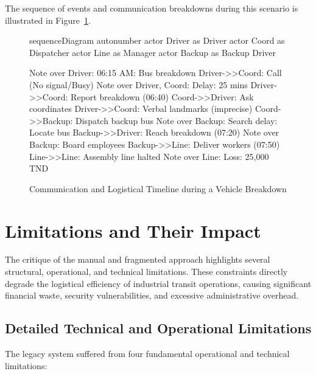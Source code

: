 The sequence of events and communication breakdowns during this scenario is illustrated in Figure~\ref{fig:breakdown_scenario_timeline}.

\begin{figure}[H]
  \centering
  \begin{mermaid}[width=1.0\textwidth]
sequenceDiagram
    autonumber
    actor Driver as Driver
    actor Coord as Dispatcher
    actor Line as Manager
    actor Backup as Backup Driver

    Note over Driver: 06:15 AM: Bus breakdown
    Driver->>Coord: Call (No signal/Busy)
    Note over Driver, Coord: Delay: 25 mins
    Driver->>Coord: Report breakdown (06:40)
    Coord->>Driver: Ask coordinates
    Driver->>Coord: Verbal landmarks (imprecise)
    Coord->>Backup: Dispatch backup bus
    Note over Backup: Search delay: Locate bus
    Backup->>Driver: Reach breakdown (07:20)
    Note over Backup: Board employees
    Backup->>Line: Deliver workers (07:50)
    Line->>Line: Assembly line halted
    Note over Line: Loss: 25,000 TND
  \end{mermaid}
  \caption{Communication and Logistical Timeline during a Vehicle Breakdown}
  \label{fig:breakdown_scenario_timeline}
\end{figure}

\section{Limitations and Their Impact}

The critique of the manual and fragmented approach highlights several structural, operational, and technical limitations. These constraints directly degrade the logistical efficiency of industrial transit operations, causing significant financial waste, security vulnerabilities, and excessive administrative overhead.

\subsection{Detailed Technical and Operational Limitations}

The legacy system suffered from four fundamental operational and technical limitations:

